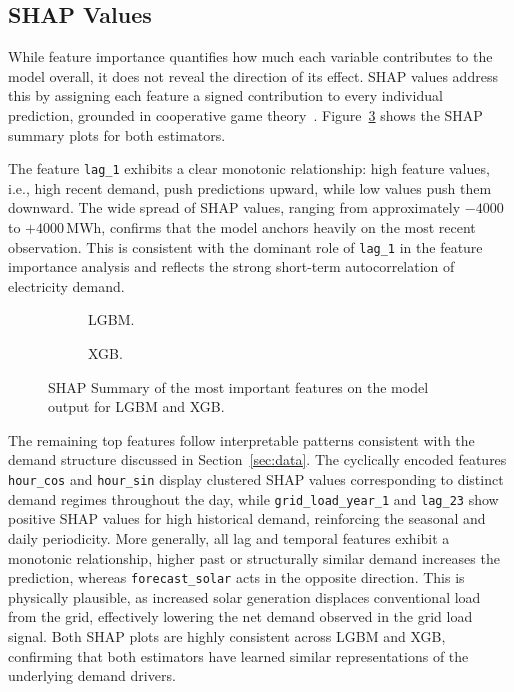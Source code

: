 \subsection{\acs{SHAP} Values}
\label{subsec:shap_values}
While feature importance quantifies how much each variable contributes to the model overall, it does not reveal the direction of its effect. \ac{SHAP} values address this by assigning each feature a signed contribution to every individual prediction, grounded in cooperative game theory~\cite{lundberg_2017_unified}. Figure~\ref{fig:shap} shows the \ac{SHAP} summary plots for both estimators.

The feature \texttt{lag\_1} exhibits a clear monotonic relationship: high feature values, i.e., high recent demand,  push predictions upward, while low values push them downward. The wide spread of \ac{SHAP} values, ranging from approximately $-4000$ to $+4000$\,MWh, confirms that the model anchors heavily on the most recent observation. This is consistent with the dominant role of \texttt{lag\_1} in the feature importance analysis and reflects the strong short-term autocorrelation of electricity demand.
\begin{figure}[ht]
    \centering
    \begin{subfigure}[c]{0.48\linewidth}
        \centering
        \caption{\acs{LGBM}.}
        \label{fig:shap_lgbm}
    \end{subfigure}%
    \begin{subfigure}[c]{0.48\linewidth}
        \centering
        \caption{\acs{XGB}.}
        \label{fig:shap_xgb}
    \end{subfigure}
    \caption{\acs{SHAP} Summary of the most important features on the model output for \acs{LGBM} and \acs{XGB}.}
    \label{fig:shap}
\end{figure}

The remaining top features follow interpretable patterns consistent with the demand structure discussed in Section~\ref{sec:data}. The cyclically encoded features \texttt{hour\_cos} and \texttt{hour\_sin} display clustered SHAP values corresponding to distinct demand regimes throughout the day, while \texttt{grid\_load\_year\_1} and \texttt{lag\_23} show positive \ac{SHAP} values for high historical demand, reinforcing the seasonal and daily periodicity. More generally, all lag and temporal features exhibit a monotonic relationship, higher past or structurally similar demand increases the prediction, whereas \texttt{forecast\_solar} acts in the opposite direction. This is physically plausible, as increased solar generation displaces conventional load from the grid, effectively lowering the net demand observed in the grid load signal. Both \ac{SHAP} plots are highly consistent across \acs{LGBM} and \acs{XGB}, confirming that both estimators have learned similar representations of the underlying demand drivers.


